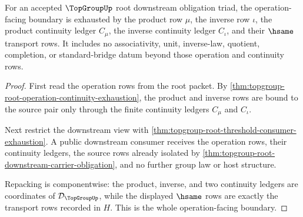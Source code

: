 \begin{theorem}
\label{thm:topgroup-root-downstream-operation-obligation}
For an accepted $\TopGroupUp$ root downstream obligation triad, the
operation-facing boundary is exhausted by the product row $\mu$, the inverse row
$\iota$, the product continuity ledger $C_{\mu}$, the inverse continuity ledger
$C_{\iota}$, and their $\hsame$ transport rows. It includes no associativity,
unit, inverse-law, quotient, completion, or standard-bridge datum beyond those
operation and continuity rows.
\end{theorem}
\begin{proof}
First read the operation rows from the root packet. By
\autoref{thm:topgroup-root-operation-continuity-exhaustion}, the product and
inverse rows are bound to the source pair only through the finite continuity
ledgers $C_{\mu}$ and $C_{\iota}$.

Next restrict the downstream view with
\autoref{thm:topgroup-root-threshold-consumer-exhaustion}. A public downstream
consumer receives the operation rows, their continuity ledgers, the source rows
already isolated by
\autoref{thm:topgroup-root-downstream-carrier-obligation}, and no further group
law or host structure.

Repacking is componentwise: the product, inverse, and two continuity ledgers are
coordinates of $\mathcal{D}_{\TopGroupUp}$, while the displayed $\hsame$ rows are
exactly the transport rows recorded in $H$. This is the whole operation-facing
boundary.
\end{proof}

